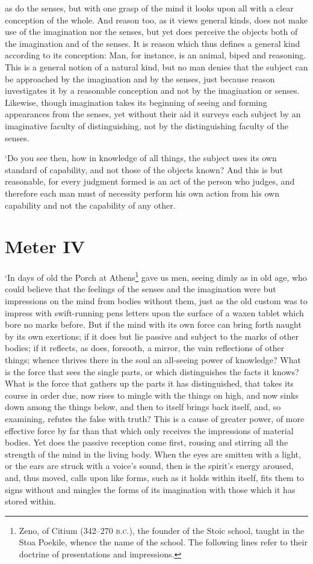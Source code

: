 as do the senses, but with one grasp of the mind it looks upon all
with a clear conception of the whole. And reason too, as it views
general kinds, does not make use of the imagination nor the senses,
but yet does perceive the objects both of the imagination and of the
senses. It is reason which thus defines a general kind according to
its conception: Man, for instance, is an animal, biped and reasoning.
This is a general notion of a natural kind, but no man denies that the
subject can be approached by the imagination and by the senses, just
because reason investigates it by a reasonable conception and not by
the imagination or senses. Likewise, though imagination takes its
beginning of seeing and forming appearances from the senses, yet
without their aid it surveys each subject by an imaginative faculty of
distinguishing, not by the distinguishing faculty of the senses.

`Do you see then, how in knowledge of all things, the subject uses its
own standard of capability, and not those of the objects known? And
this is but reasonable, for every judgment formed is an act of the
person who judges, and therefore each man must of necessity perform
 his own action from his own capability and not the
capability of any other.

\section*{Meter IV}

`In days of old the Porch at Athens\footnote{Zeno, of Citium (342--270
\textsc{b.c.}), the founder of the Stoic school, taught in the Stoa
Poekile, whence the name of the school. The following lines refer to
their doctrine of presentations and impressions.} gave us men, seeing
dimly as in old age, who could believe that the feelings of the senses
and the imagination were but impressions on the mind from bodies
without them, just as the old custom was to impress with swift-running
pens letters upon the surface of a waxen tablet which bore no marks
before. But if the mind with its own force can bring forth naught by
its own exertions; if it does but lie passive and subject to the marks
of other bodies; if it reflects, as does, forsooth, a mirror, the vain
reflections of other things; whence thrives there in the soul an
all-seeing power of knowledge? What is the force that sees the single
parts, or which distinguishes the facts it knows? What is the force
that gathers up the parts it has distinguished, that takes its course
in order due, now rises to mingle with the things on high, and now
sinks down among the things below, and then to itself brings back
itself, and, so examining, refutes the false with truth? This is a
cause of greater power, of more effective force by far than that which
only receives the impressions of material bodies. Yet does the passive
reception come first, rousing and stirring  all the strength
of the mind in the living body. When the eyes are smitten with a
light, or the ears are struck with a voice's sound, then is the
spirit's energy aroused, and, thus moved, calls upon like forms, such
as it holds within itself, fits them to signs without and mingles the
forms of its imagination with those which it has stored within.

